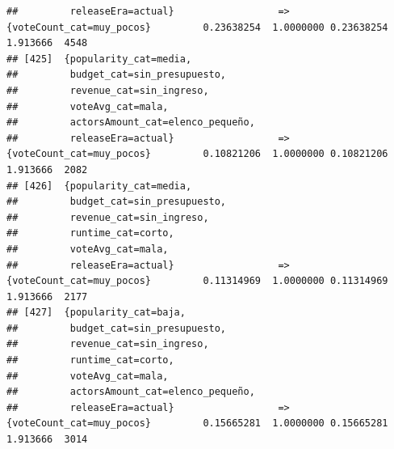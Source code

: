 \documentclass[
]{article}
\begin{document}
\begin{verbatim}
##         releaseEra=actual}                  => {voteCount_cat=muy_pocos}         0.23638254  1.0000000 0.23638254 1.913666  4548
## [425]  {popularity_cat=media,                                                                                                   
##         budget_cat=sin_presupuesto,                                                                                             
##         revenue_cat=sin_ingreso,                                                                                                
##         voteAvg_cat=mala,                                                                                                       
##         actorsAmount_cat=elenco_pequeño,                                                                                        
##         releaseEra=actual}                  => {voteCount_cat=muy_pocos}         0.10821206  1.0000000 0.10821206 1.913666  2082
## [426]  {popularity_cat=media,                                                                                                   
##         budget_cat=sin_presupuesto,                                                                                             
##         revenue_cat=sin_ingreso,                                                                                                
##         runtime_cat=corto,                                                                                                      
##         voteAvg_cat=mala,                                                                                                       
##         releaseEra=actual}                  => {voteCount_cat=muy_pocos}         0.11314969  1.0000000 0.11314969 1.913666  2177
## [427]  {popularity_cat=baja,                                                                                                    
##         budget_cat=sin_presupuesto,                                                                                             
##         revenue_cat=sin_ingreso,                                                                                                
##         runtime_cat=corto,                                                                                                      
##         voteAvg_cat=mala,                                                                                                       
##         actorsAmount_cat=elenco_pequeño,                                                                                        
##         releaseEra=actual}                  => {voteCount_cat=muy_pocos}         0.15665281  1.0000000 0.15665281 1.913666  3014

\end{verbatim}
\end{document}
